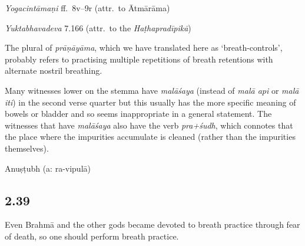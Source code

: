 \begin{ekdosis}
\begin{testimonia}[hp02_038]
\emph{Yogacintāmaṇi} ff.~8v–9r (attr.~to Ātmārāma)

\begin{versinnote}
\end{versinnote}

\emph{Yuktabhavadeva} 7.166 (attr.~to the \emph{Haṭhapradīpikā})

\begin{versinnote}
\end{versinnote}
\end{testimonia}

\begin{philcomm}[hp02_038]
The plural of \emph{prāṇāyāma}, which we have translated here as ‘breath-controls’, probably refers to practising multiple repetitions of breath retentions with alternate nostril breathing. 

Many witnesses lower on the stemma have \emph{malāśaya} (instead of \emph{malā api} or \emph{malā iti}) in the second verse quarter but this usually has the more specific meaning of bowels or bladder and so seems inappropriate in a general statement. The witnesses that have \emph{malāśaya} also have the verb \emph{pra+śudh}, which connotes that the place where the impurities accumulate is cleaned (rather than the impurities themselves). 
\end{philcomm}

\begin{metre}[hp02_038]
Anuṣṭubh (a: ra-vipulā)
\end{metre}

\subsection*{2.39}
\begin{translation}[hp02_039]
Even Brahmā and the other gods became devoted to breath practice through fear of death, so one should perform breath practice.
\end{translation}


\end{ekdosis}
